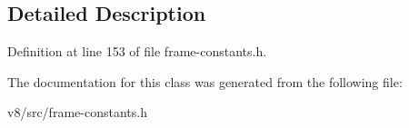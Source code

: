 \subsection{Detailed Description}


Definition at line 153 of file frame-\/constants.\+h.



The documentation for this class was generated from the following file\+:\begin{DoxyCompactItemize}
\item 
v8/src/frame-\/constants.\+h\end{DoxyCompactItemize}

